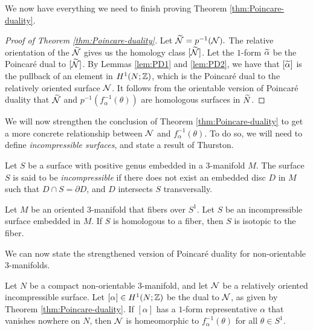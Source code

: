 We now have everything we need to finish proving Theorem \ref{thm:Poincare-duality}.
\begin{proof}[Proof of Theorem \ref{thm:Poincare-duality}]
  Let $\widetilde{\mathcal{N}}=p^{-1}(\mathcal{N}).$
  The relative orientation of the $\widetilde{\mathcal{N}}$ gives us the homology class $[\widetilde{\mathcal{N}}]$.  Let the $1$-form $\widetilde{\alpha}$ be the Poincar\'e dual to $[\widetilde{\mathcal{N}}]$.
  By Lemmas \ref{lem:PD1} and \ref{lem:PD2}, we have that $[\widetilde{\alpha}]$ is the pullback of an element in $H^1(N; \mathbb{Z})$, which is the Poincar\'e dual to the relatively oriented surface $\mathcal{N}$.
  It follows from the orientable version of Poincar\'e duality that $\widetilde{\mathcal{N}}$ and $p^{-1}(f_{\alpha}^{-1}(\theta))$ are homologous surfaces in $\widetilde{N}$.
\end{proof}

We will now strengthen the conclusion of Theorem \ref{thm:Poincare-duality} to get a more concrete relationship between $\mathcal{N}$ and $f_{\alpha}^{-1}(\theta)$.
To do so, we will need to define \emph{incompressible surfaces}, and state a result of Thurston.

  Let $S$ be a surface with positive genus embedded in a $3$-manifold $M$.
  The surface $S$ is said to be \emph{incompressible} if there does not exist an embedded disc $D$ in $M$ such that $D \cap S = \partial D$, and $D$ intersects $S$ transversally.

\begin{thm}
  \label{thm:Thur2}
Let $M$ be an oriented 3-manifold that fibers over $S^1$.  Let $S$ be an incompressible surface embedded in $M$.  If $S$ is homologous to a fiber, then $S$ is isotopic to the fiber.
\end{thm}

We can now state the strengthened version of Poincar\'e duality for non-orientable $3$-manifolds.
\begin{thm}
  \label{thm:strong-duality}
  Let $N$ be a compact non-orientable $3$-manifold, and let $\mathcal{N}$ be a relatively oriented incompressible surface.
  Let $[\alpha] \in H^1(N; \mathbb{Z})$ be the dual to $\mathcal{N}$, as given by Theorem \ref{thm:Poincare-duality}.
  If $[\alpha]$ has a $1$-form representative $\alpha$ that vanishes nowhere on $N$, then $\mathcal{N}$ is homeomorphic to $f_{\alpha}^{-1}(\theta)$ for all $\theta \in S^1$.
\end{thm}

